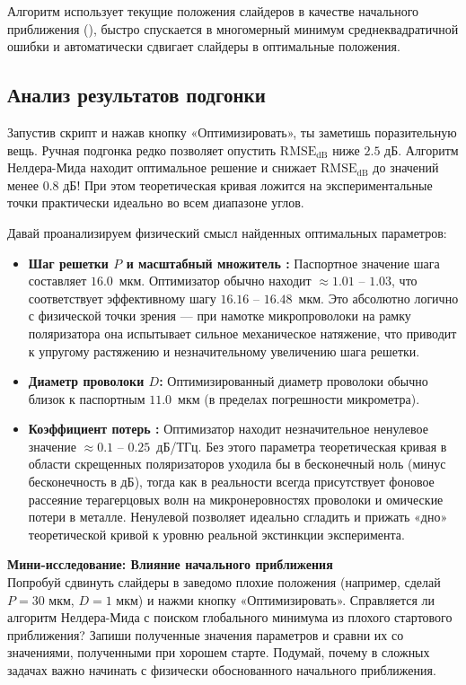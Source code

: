 Алгоритм использует текущие положения слайдеров в качестве начального приближения (), быстро спускается в многомерный минимум среднеквадратичной ошибки и автоматически сдвигает слайдеры в оптимальные положения.

\subsection{Анализ результатов подгонки}

Запустив скрипт и нажав кнопку «Оптимизировать», ты заметишь поразительную вещь. Ручная подгонка редко позволяет опустить $\text{RMSE}_{\text{dB}}$ ниже $2.5$ дБ. Алгоритм Нелдера-Мида находит оптимальное решение и снижает $\text{RMSE}_{\text{dB}}$ до значений менее $0.8$ дБ! При этом теоретическая кривая ложится на экспериментальные точки практически идеально во всем диапазоне углов.

Давай проанализируем физический смысл найденных оптимальных параметров:
\begin{itemize}
    \item \textbf{Шаг решетки $P$ и масштабный множитель :} Паспортное значение шага составляет $16.0$~мкм. Оптимизатор обычно находит  $\approx 1.01$ -- $1.03$, что соответствует эффективному шагу $16.16$ -- $16.48$~мкм. Это абсолютно логично с физической точки зрения — при намотке микропроволоки на рамку поляризатора она испытывает сильное механическое натяжение, что приводит к упругому растяжению и незначительному увеличению шага решетки.
    
    \item \textbf{Диаметр проволоки $D$:} Оптимизированный диаметр проволоки обычно близок к паспортным $11.0$~мкм (в пределах погрешности микрометра).
    
    \item \textbf{Коэффициент потерь :} Оптимизатор находит незначительное ненулевое значение  $\approx 0.1$ -- $0.25$~дБ/ТГц. Без этого параметра теоретическая кривая в области скрещенных поляризаторов уходила бы в бесконечный ноль (минус бесконечность в дБ), тогда как в реальности всегда присутствует фоновое рассеяние терагерцовых волн на микронеровностях проволоки и омические потери в металле. Ненулевой  позволяет идеально сгладить и прижать «дно» теоретической кривой к уровню реальной экстинкции эксперимента.
\end{itemize}

\begin{minitaskbox}
\textbf{Мини-исследование: Влияние начального приближения}
\\
Попробуй сдвинуть слайдеры в заведомо плохие положения (например, сделай $P = 30$ мкм, $D = 1$ мкм) и нажми кнопку «Оптимизировать». Справляется ли алгоритм Нелдера-Мида с поиском глобального минимума из плохого стартового приближения? Запиши полученные значения параметров и сравни их со значениями, полученными при хорошем старте. Подумай, почему в сложных задачах важно начинать с физически обоснованного начального приближения.
\end{minitaskbox}

